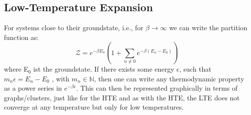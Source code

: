 \documentclass{article}
\begin{document}
\subsection{Low-Temperature Expansion}
For systems close to their groundstate, i.e., for $\beta \to \infty$
we can write the partition function as:
\begin{equation}
\label{eq:12}
\mathcal{Z} = e^{-\beta E_0} \left( 1 + \sum\limits_{n \neq 0}
  e^{-\beta (E_n - E_0)} \right)
\end{equation}
where E$_0$ ist the groundstate. If there exists some energy
$\epsilon$, such that $m_n \epsilon = E_n - E_0$ , with $m_n \in
\mathbb{N}$, then one can write any thermodynamic property as a power
series in $e^{-\beta \epsilon}$. This can then be represented
graphically in terms of  graphs/clusters, just like for the HTE
\cite{Rigol,Series} and as with the HTE, the LTE does not converge at
any temperature but only for low temperatures.
\end{document}
